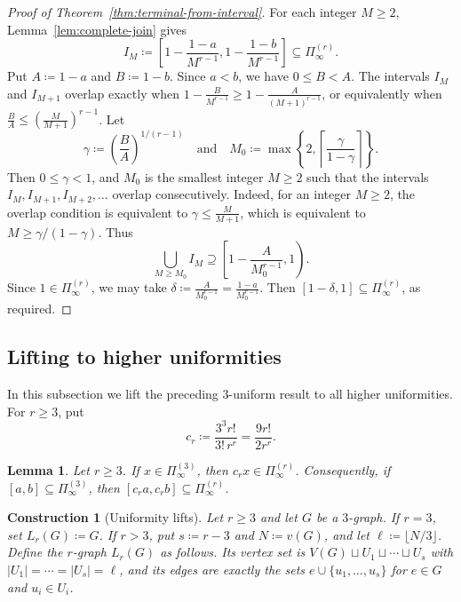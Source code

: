 \documentclass[10pt]{article}
\numberwithin{equation}{section}
\newtheorem{lemma}[theorem]{Lemma}
\newtheorem{construction}[theorem]{Construction}
\begin{document}
\begin{proof}[Proof of Theorem~\ref{thm:terminal-from-interval}]
For each integer $M\ge 2$, Lemma~\ref{lem:complete-join} gives
\[
        I_M\coloneqq \left[ 1-\frac{1-a}{M^{r-1}}, 1-\frac{1-b}{M^{r-1}} \right] \subseteq\Pi^{(r)}_\infty .
\]
Put $A\coloneqq 1-a$ and $B\coloneqq 1-b$. Since $a<b$, we have $0\le B<A$. The intervals $I_M$ and $I_{M+1}$ overlap exactly when $1-\frac{B}{M^{r-1}}\ge 1-\frac{A}{(M+1)^{r-1}}$, or equivalently when $\frac BA\le \left(\frac{M}{M+1}\right)^{r-1}$. 
Let
\[
        \gamma\coloneqq \left(\frac BA\right)^{1/(r-1)}
        \quad\text{and}\quad
        M_0\coloneqq \max\left\{2,\left\lceil\frac{\gamma}{1-\gamma}\right\rceil\right\}.
\]
Then $0\le \gamma<1$, and $M_0$ is the smallest integer $M\ge 2$ such that the intervals $I_M,I_{M+1},I_{M+2},\ldots$ overlap consecutively. Indeed, for an integer $M\ge 2$, the overlap condition is equivalent to $\gamma\le \frac{M}{M+1}$, which is equivalent to $M\ge \gamma/(1-\gamma)$.
Thus
\[
        \bigcup_{M\ge M_0} I_M
        \supseteq \left[1-\frac{A}{M_0^{r-1}},1\right).
\]
Since $1\in\Pi^{(r)}_\infty$, we may take $\delta\coloneqq \frac{A}{M_0^{r-1}}=\frac{1-a}{M_0^{r-1}}$. 
Then $[1-\delta,1]\subseteq\Pi^{(r)}_\infty$, as required.
\end{proof}

\subsection{Lifting to higher uniformities}
\label{sec:lifting}
%
In this subsection we lift the preceding $3$-uniform result to all higher uniformities. For $r\ge 3$, put
\[
        c_r\coloneqq \frac{3^3 r!}{3!\,r^r}=\frac{9r!}{2r^r}.
\]

\begin{lemma}\label{lem:uniformity-lift} 
Let $r\ge 3$. If $x\in\Pi^{(3)}_\infty$, then $c_rx\in\Pi^{(r)}_\infty$. Consequently, if $[a,b]\subseteq\Pi^{(3)}_\infty$, then $[c_ra,c_rb]\subseteq\Pi^{(r)}_\infty$. 
\end{lemma}


\begin{construction}[Uniformity lifts]\label{con:uniformity-lift} 
Let $r\ge 3$ and let $G$ be a $3$-graph. If $r=3$, set $L_r(G)\coloneqq G$. If $r>3$, put $s\coloneqq r-3$ and $N\coloneqq v(G)$, and let $\ell\coloneqq \lfloor N/3\rfloor$. Define the $r$-graph $L_r(G)$ as follows. Its vertex set is $V(G)\sqcup U_1\sqcup\cdots\sqcup U_s$ with $|U_1|=\cdots=|U_s|=\ell$, and its edges are exactly the sets $e\cup\{u_1,\ldots,u_s\}$ for $e \in G$ and $u_i \in U_i$. 
\end{construction}
\end{document}
